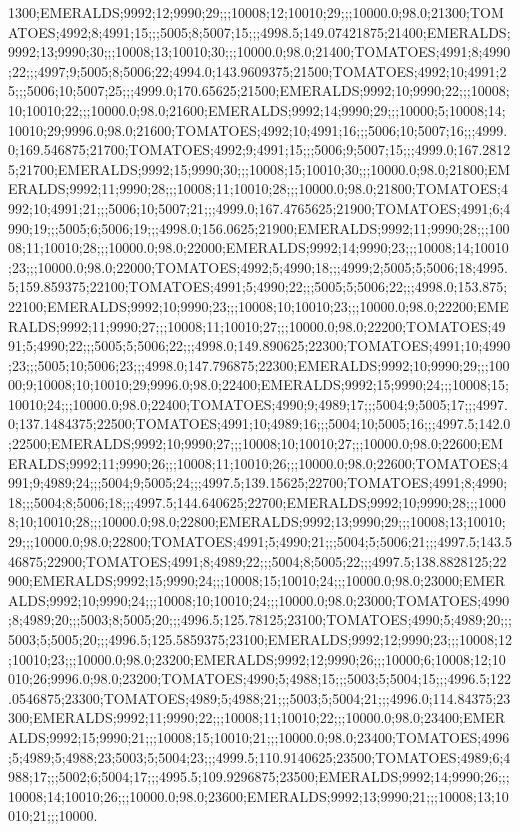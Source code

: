 1300;EMERALDS;9992;12;9990;29;;;10008;12;10010;29;;;10000.0;98.0;21300;TOMATOES;4992;8;4991;15;;;5005;8;5007;15;;;4998.5;149.07421875;21400;EMERALDS;9992;13;9990;30;;;10008;13;10010;30;;;10000.0;98.0;21400;TOMATOES;4991;8;4990;22;;;4997;9;5005;8;5006;22;4994.0;143.9609375;21500;TOMATOES;4992;10;4991;25;;;5006;10;5007;25;;;4999.0;170.65625;21500;EMERALDS;9992;10;9990;22;;;10008;10;10010;22;;;10000.0;98.0;21600;EMERALDS;9992;14;9990;29;;;10000;5;10008;14;10010;29;9996.0;98.0;21600;TOMATOES;4992;10;4991;16;;;5006;10;5007;16;;;4999.0;169.546875;21700;TOMATOES;4992;9;4991;15;;;5006;9;5007;15;;;4999.0;167.28125;21700;EMERALDS;9992;15;9990;30;;;10008;15;10010;30;;;10000.0;98.0;21800;EMERALDS;9992;11;9990;28;;;10008;11;10010;28;;;10000.0;98.0;21800;TOMATOES;4992;10;4991;21;;;5006;10;5007;21;;;4999.0;167.4765625;21900;TOMATOES;4991;6;4990;19;;;5005;6;5006;19;;;4998.0;156.0625;21900;EMERALDS;9992;11;9990;28;;;10008;11;10010;28;;;10000.0;98.0;22000;EMERALDS;9992;14;9990;23;;;10008;14;10010;23;;;10000.0;98.0;22000;TOMATOES;4992;5;4990;18;;;4999;2;5005;5;5006;18;4995.5;159.859375;22100;TOMATOES;4991;5;4990;22;;;5005;5;5006;22;;;4998.0;153.875;22100;EMERALDS;9992;10;9990;23;;;10008;10;10010;23;;;10000.0;98.0;22200;EMERALDS;9992;11;9990;27;;;10008;11;10010;27;;;10000.0;98.0;22200;TOMATOES;4991;5;4990;22;;;5005;5;5006;22;;;4998.0;149.890625;22300;TOMATOES;4991;10;4990;23;;;5005;10;5006;23;;;4998.0;147.796875;22300;EMERALDS;9992;10;9990;29;;;10000;9;10008;10;10010;29;9996.0;98.0;22400;EMERALDS;9992;15;9990;24;;;10008;15;10010;24;;;10000.0;98.0;22400;TOMATOES;4990;9;4989;17;;;5004;9;5005;17;;;4997.0;137.1484375;22500;TOMATOES;4991;10;4989;16;;;5004;10;5005;16;;;4997.5;142.0;22500;EMERALDS;9992;10;9990;27;;;10008;10;10010;27;;;10000.0;98.0;22600;EMERALDS;9992;11;9990;26;;;10008;11;10010;26;;;10000.0;98.0;22600;TOMATOES;4991;9;4989;24;;;5004;9;5005;24;;;4997.5;139.15625;22700;TOMATOES;4991;8;4990;18;;;5004;8;5006;18;;;4997.5;144.640625;22700;EMERALDS;9992;10;9990;28;;;10008;10;10010;28;;;10000.0;98.0;22800;EMERALDS;9992;13;9990;29;;;10008;13;10010;29;;;10000.0;98.0;22800;TOMATOES;4991;5;4990;21;;;5004;5;5006;21;;;4997.5;143.546875;22900;TOMATOES;4991;8;4989;22;;;5004;8;5005;22;;;4997.5;138.8828125;22900;EMERALDS;9992;15;9990;24;;;10008;15;10010;24;;;10000.0;98.0;23000;EMERALDS;9992;10;9990;24;;;10008;10;10010;24;;;10000.0;98.0;23000;TOMATOES;4990;8;4989;20;;;5003;8;5005;20;;;4996.5;125.78125;23100;TOMATOES;4990;5;4989;20;;;5003;5;5005;20;;;4996.5;125.5859375;23100;EMERALDS;9992;12;9990;23;;;10008;12;10010;23;;;10000.0;98.0;23200;EMERALDS;9992;12;9990;26;;;10000;6;10008;12;10010;26;9996.0;98.0;23200;TOMATOES;4990;5;4988;15;;;5003;5;5004;15;;;4996.5;122.0546875;23300;TOMATOES;4989;5;4988;21;;;5003;5;5004;21;;;4996.0;114.84375;23300;EMERALDS;9992;11;9990;22;;;10008;11;10010;22;;;10000.0;98.0;23400;EMERALDS;9992;15;9990;21;;;10008;15;10010;21;;;10000.0;98.0;23400;TOMATOES;4996;5;4989;5;4988;23;5003;5;5004;23;;;4999.5;110.9140625;23500;TOMATOES;4989;6;4988;17;;;5002;6;5004;17;;;4995.5;109.9296875;23500;EMERALDS;9992;14;9990;26;;;10008;14;10010;26;;;10000.0;98.0;23600;EMERALDS;9992;13;9990;21;;;10008;13;10010;21;;;10000.